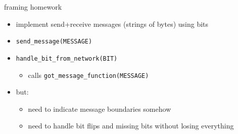 \begin{frame}{framing homework}
    \begin{itemize}
    \item implement send+receive messages (strings of bytes) using bits
    \item \texttt{send\_message(MESSAGE)}
    \item \texttt{handle\_bit\_from\_network(BIT)}
        \begin{itemize}
        \item calls \texttt{got\_message\_function(MESSAGE)}
        \end{itemize}
    \vspace{.5cm}
    \item but:
        \begin{itemize}
        \item need to indicate message boundaries somehow
        \item need to handle bit flips and missing bits without losing everything
        \end{itemize}
    \end{itemize}
\end{frame}
